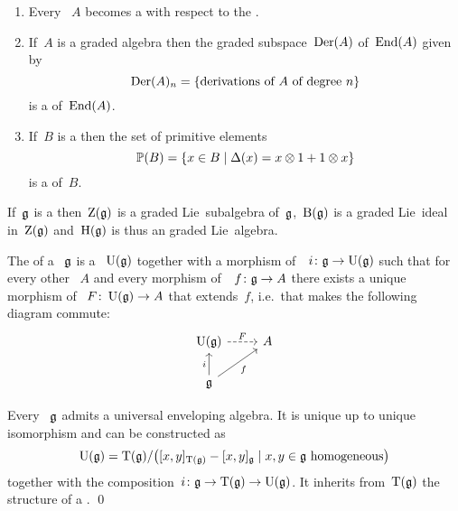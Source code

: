 \documentclass[a4paper,10pt,headings=standardclasses]{scrartcl}
\begin{document}
\begin{example}
  \leavevmode
  \begin{enumerate}
    \item
      Every {\dga}~$A$ becomes a {\dgl} with respect to the {\dgcom}.
    \item
      If~$A$ is a graded algebra then the graded subspace~$\operatorname{Der}(A)$ of~$\operatorname{End}(A)$ given by
      \[
        \operatorname{Der}(A)_n
        =
        \{
          \text{derivations of~$A$ of degree~$n$}
        \}
      \]
      is a {\dglsub} of~$\operatorname{End}(A)$.
    \item
      If~$B$ is a {\dgb} then the set of primitive elements
      \[
        \prim(B)
        =
        \{
          x \in B
        \suchthat
          \Delta(x) = x \tensor 1 + 1 \tensor x
        \}
      \]
      is a {\dglsub} of~$B$.
  \end{enumerate}
\end{example}

\begin{lemma}
  If~$\mathfrak{g}$ is a {\dgl} then~$\operatorname{Z}(\mathfrak{g})$ is a graded Lie~subalgebra of~$\mathfrak{g}$,~$\operatorname{B}(\mathfrak{g})$ is a graded Lie~ideal in~$\operatorname{Z}(\mathfrak{g})$ and~$\operatorname{H}(\mathfrak{g})$ is thus an graded Lie~algebra. 
\end{lemma}


\begin{definition}
  The  of a {\dgl}~$\mathfrak{g}$ is a {\dga}~$\operatorname{U}(\mathfrak{g})$ together with a morphism of~{\dgls}~$i \colon \mathfrak{g} \to \operatorname{U}(\mathfrak{g})$ such that for every other {\dga}~$A$ and every morphism of~{\dgls}~$f \colon \mathfrak{g} \to A$ there exists a unique morphism of {\dgas}~$F \colon \operatorname{U}(\mathfrak{g}) \to A$ that extends~$f$, i.e.\ that makes the following diagram commute:
  \[
    \begin{tikzcd}
      \Univ(\glie)
      \arrow[dashed]{r}[above]{F}
      &
      A
      \\
      \glie
      \arrow{u}[left]{i}
      \arrow{ur}[below right]{f}
      &
      {}
    \end{tikzcd}
  \]
\end{definition}

\begin{proposition}
  Every {\dgl}~$\mathfrak{g}$ admits a universal enveloping algebra.
  It is unique up to unique isomorphism and can be constructed as
  \[
    \Univ(\glie)
    =
    \dgTensor(\glie)
    /
    \bigl(
      [x,y]_{\dgTensor(\glie)} - [x,y]_{\glie}
    \suchthat
      \text{$x, y \in \glie$ homogeneous}
    \bigr)
  \]
  together with the composition~$i \colon \mathfrak{g} \to \operatorname{T}(\mathfrak{g}) \to \operatorname{U}(\mathfrak{g})$.
  It inherits from~$\operatorname{T}(\mathfrak{g})$ the structure of a {\dgh}.
  \qed
\end{proposition}
\end{document}

